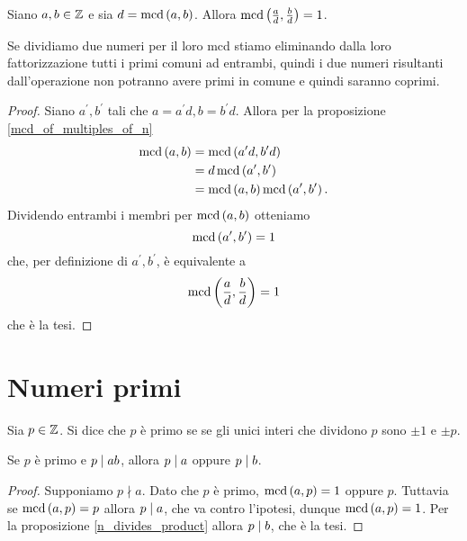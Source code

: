 \begin{corollary} \label{mcd_diviso_mcd}
    Siano $a, b \in \mathbb{Z}$ e sia $d = \operatorname{mcd}\left(a, b\right)$. Allora $\operatorname{mcd}\left(\frac{a}{d}, \frac{b}{d}\right) = 1$.
\end{corollary}
\begin{intuition}
    Se dividiamo due numeri per il loro mcd stiamo eliminando dalla loro fattorizzazione tutti i primi comuni ad entrambi, quindi i due numeri risultanti dall'operazione non potranno avere primi in comune e quindi saranno coprimi.
\end{intuition}
\begin{proof}
    Siano $a^\prime, b^\prime$ tali che $a = a^\prime d, b = b^\prime d$. Allora per la proposizione \ref{mcd_of_multiples_of_n}
    \begin{alignat*}{1}
        \operatorname{mcd}\left(a, b\right) &= \operatorname{mcd}\left(a^\prime d, b^\prime d\right) \\
                   &= d\operatorname{mcd}\left(a^\prime, b^\prime\right) \\
                   &= \operatorname{mcd}\left(a, b\right) \operatorname{mcd}\left(a^\prime, b^\prime\right).
        \end{alignat*} 
    Dividendo entrambi i membri per $\operatorname{mcd}\left(a, b\right)$ otteniamo \[
        \operatorname{mcd}\left(a^\prime, b^\prime\right) = 1 
    \]
    che, per definizione di $a^\prime, b^\prime$, è equivalente a \[
        \operatorname{mcd}\left(\frac{a}{d}, \frac{b}{d}\right) = 1
    \]
    che è la tesi.
\end{proof}

\section{Numeri primi}

\begin{definition}
    Sia $p \in \mathbb{Z}$. Si dice che $p$ è primo se se gli unici interi che dividono $p$ sono
    $\pm 1$ e $\pm p$.
\end{definition}

\begin{proposition}\label{primo_divide_prodotto}
    Se $p$ è primo e $p \mid ab$, allora $p \mid a$ oppure $p \mid b$.
\end{proposition}
\begin{proof}
    Supponiamo $p \nmid a$. Dato che $p$ è primo, $\operatorname{mcd}\left(a, p\right) = 1$ oppure $p$.
    Tuttavia se $\operatorname{mcd}\left(a, p\right) = p$ allora $p \mid a$, che va contro l'ipotesi, dunque 
    $\operatorname{mcd}\left(a, p\right) = 1$. Per la proposizione \ref{n_divides_product} allora $p \mid b$, che è la tesi.
\end{proof}

